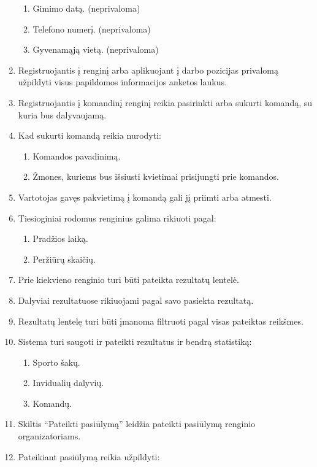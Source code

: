 \documentclass{VUMIFPSkursinis}
\begin{document}
\begin{enumerate}[label=\textbf{FR\arabic*}]
\begin{enumerate}[label*=\textbf{.\arabic*}]
						\item Gimimo datą. (neprivaloma)
						\item Telefono numerį. (neprivaloma)
						\item Gyvenamąją vietą. (neprivaloma)
					\end{enumerate}
				\item Registruojantis į renginį arba aplikuojant į darbo pozicijas privalomą užpildyti visus papildomos informacijos anketos laukus.
				\item Registruojantis į komandinį renginį reikia pasirinkti arba sukurti komandą, su kuria bus dalyvaujamą.
				\item Kad sukurti komandą reikia nurodyti:
					\begin{enumerate}[label*=\textbf{.\arabic*}]
						\item Komandos pavadinimą.
						\item Žmones, kuriems bus išsiusti kvietimai prisijungti prie komandos.
					\end{enumerate}
				\item Vartotojas gavęs pakvietimą į komandą gali jį priimti arba atmesti.
				\item Tiesioginiai rodomus renginius galima rikiuoti pagal:
					\begin{enumerate}[label*=\textbf{.\arabic*}]
						\item Pradžios laiką.
						\item Peržiūrų skaičių.
					\end{enumerate}
				\item Prie kiekvieno renginio turi būti pateikta rezultatų lentelė.
				\item Dalyviai rezultatuose rikiuojami pagal savo pasiekta rezultatą.
				\item Rezultatų lentelę turi būti įmanoma filtruoti pagal visas pateiktas reikšmes.
                \item Sistema turi saugoti ir pateikti rezultatus ir bendrą statistiką:
					\begin{enumerate}[label*=\textbf{.\arabic*}]
						\item Sporto šakų.
						\item Invidualių dalyvių.
						\item Komandų.
					\end{enumerate}
				\item Skiltis “Pateikti pasiūlymą” leidžia pateikti pasiūlymą renginio organizatoriams.
				\item Pateikiant pasiūlymą reikia užpildyti:

\end{enumerate}
\end{document}
